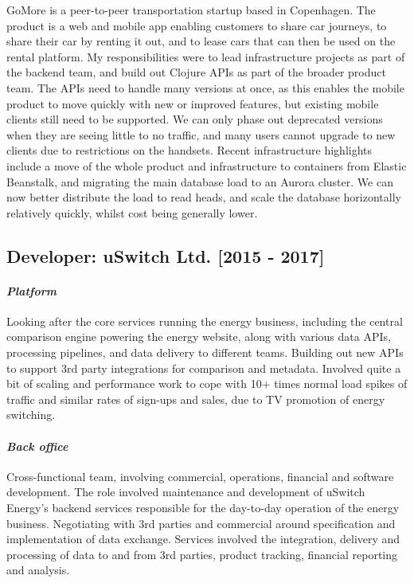 \documentclass{article}
\begin{document}
GoMore is a peer-to-peer transportation startup based in Copenhagen. The product
is a web and mobile app enabling customers to share car journeys, to share their
car by renting it out, and to lease cars that can then be used on the rental
platform.
My responsibilities were to lead infrastructure projects as part of the backend
team, and build out Clojure APIs as part of the broader product team. The
APIs need to handle many versions at once, as this enables the mobile product to
move quickly with new or improved features, but existing mobile clients still
need to be supported. We can only phase out deprecated versions when they are
seeing little to no traffic, and many users cannot upgrade to new clients due to
restrictions on the handsets.
Recent infrastructure highlights include a move of the whole product and
infrastructure to containers from Elastic Beanstalk, and migrating the main
database load to an Aurora cluster. We can now better distribute the load to
read heads, and scale the database horizontally relatively quickly, whilst cost
being generally lower.
\subsection*{Developer: uSwitch Ltd. [2015 - 2017]}
\paragraph*{\emph{Platform}}

Looking after the core services running the energy business, including the
central comparison engine powering the energy website, along with various data
APIs, processing pipelines, and data delivery to different teams. Building out
new APIs to support 3rd party integrations for comparison and metadata. Involved
quite a bit of scaling and performance work to cope with 10+ times normal load
spikes of traffic and similar rates of sign-ups and sales, due to TV promotion
of energy switching.
\paragraph*{\emph{Back office}}

Cross-functional team, involving commercial, operations, financial and software
development. The role involved maintenance and development of uSwitch Energy's
backend services responsible for the day-to-day operation of the energy
business. Negotiating with 3rd parties and commercial around specification and
implementation of data exchange. Services involved the integration, delivery and
processing of data to and from 3rd parties, product tracking, financial
reporting and analysis.
\end{document}
